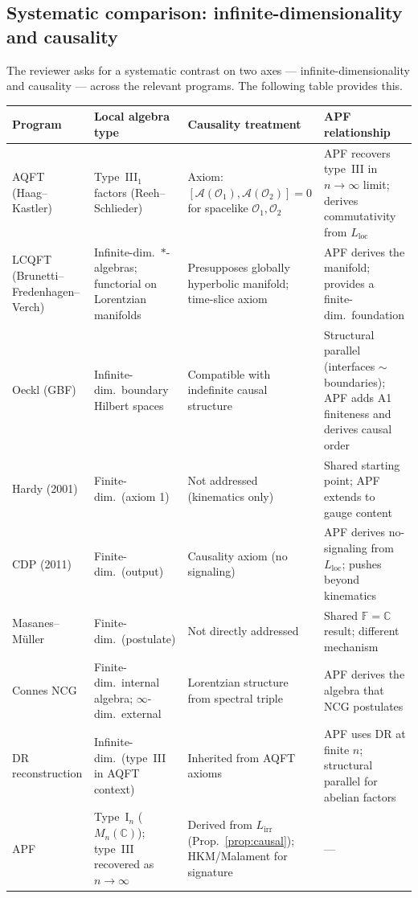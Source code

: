 \documentclass[11pt,a4paper]{article}
\theoremstyle{definition}
\begin{document}
\subsection{Systematic comparison: infinite-dimensionality and causality}
\label{sec:systematic_comparison}

The reviewer asks for a systematic contrast on two axes ---
infinite-dimensionality and causality --- across the relevant
programs.  The following table provides this.

\smallskip
\begin{center}\footnotesize
\renewcommand{\arraystretch}{1.25}
\begin{tabular}{@{}p{2.4cm}p{3.2cm}p{3.2cm}p{3.5cm}@{}}
\toprule
\textbf{Program} & \textbf{Local algebra type} &
  \textbf{Causality treatment} & \textbf{APF relationship} \\
\midrule
AQFT (Haag--Kastler) &
  Type~III$_1$ factors (Reeh--Schlieder) &
  Axiom: $[\mathcal{A}(\mathcal{O}_1), \mathcal{A}(\mathcal{O}_2)] = 0$ for spacelike $\mathcal{O}_1, \mathcal{O}_2$ &
  APF recovers type~III in $n \to \infty$ limit; derives commutativity from $L_{\mathrm{loc}}$ \\[3pt]
LCQFT (Brunetti--Fredenhagen--Verch) &
  Infinite-dim.\ $*$-algebras; functorial on Lorentzian manifolds &
  Presupposes globally hyperbolic manifold; time-slice axiom &
  APF derives the manifold; provides a finite-dim.\ foundation \\[3pt]
Oeckl (GBF) &
  Infinite-dim.\ boundary Hilbert spaces &
  Compatible with indefinite causal structure &
  Structural parallel (interfaces $\sim$ boundaries); APF adds A1 finiteness and derives causal order \\[3pt]
Hardy (2001) &
  Finite-dim.\ (axiom 1) &
  Not addressed (kinematics only) &
  Shared starting point; APF extends to gauge content \\[3pt]
CDP (2011) &
  Finite-dim.\ (output) &
  Causality axiom (no signaling) &
  APF derives no-signaling from $L_{\mathrm{loc}}$; pushes beyond kinematics \\[3pt]
Masanes--M\"uller &
  Finite-dim.\ (postulate) &
  Not directly addressed &
  Shared $\mathbb{F} = \mathbb{C}$ result; different mechanism \\[3pt]
Connes NCG &
  Finite-dim.\ internal algebra; $\infty$-dim.\ external &
  Lorentzian structure from spectral triple &
  APF derives the algebra that NCG postulates \\[3pt]
DR reconstruction &
  Infinite-dim.\ (type~III in AQFT context) &
  Inherited from AQFT axioms &
  APF uses DR at finite $n$; structural parallel for abelian factors \\[3pt]
APF &
  Type~I$_n$ ($M_n(\mathbb{C})$); type~III recovered as $n \to \infty$ &
  Derived from $L_{\mathrm{irr}}$ (Prop.~\ref{prop:causal}); HKM/Malament for signature &
  --- \\
\bottomrule
\end{tabular}
\end{center}
\end{document}
